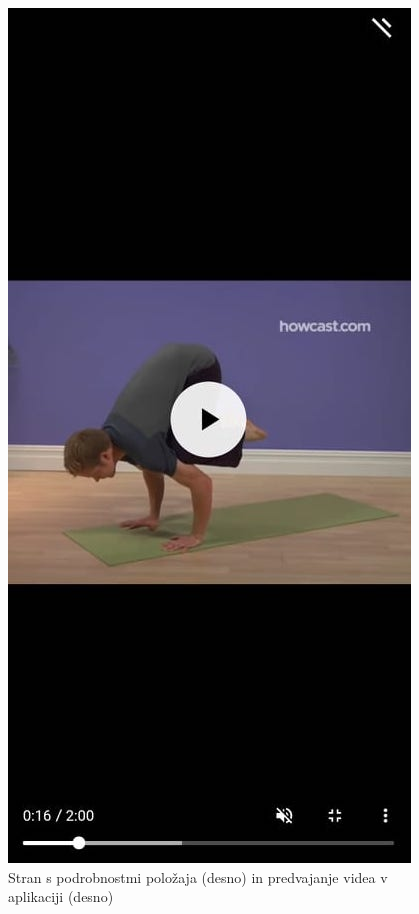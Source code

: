 \documentclass[a4paper, 12pt]{book}
\begin{document}
\begin{figure}[!htbp]
\begin{minipage}[b]{0.32\textwidth}
  \end{minipage}
  \begin{minipage}[b]{0.32\textwidth}
    \includegraphics[width=\textwidth]{videoasana.jpg}\centering
  \end{minipage}
  \label{asana2}
  \caption{Stran s podrobnostmi položaja (desno) in predvajanje videa v aplikaciji (desno)}
\end{figure}
\end{document}

